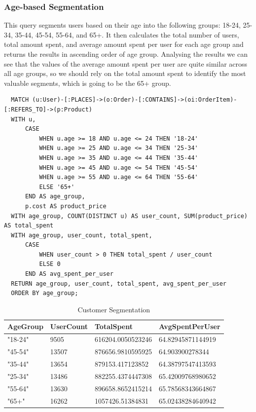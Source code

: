 \documentclass[a4paper,12pt]{article}
\begin{document}
\subsubsection{Age-based Segmentation}
This query segments users based on their age into the following groups: 18-24, 25-34, 35-44, 45-54, 55-64, and 65+.
It then calculates the total number of users, total amount spent, and average amount spent per user for each age group and returns the results in ascending order of age group.
Analysing the results we can see that the values of the average amount spent per user are quite similar across all age groups, so we should rely on the total amount spent to identify the most valuable segments, which is going to be the 65+ group.
\begin{verbatim}
  MATCH (u:User)-[:PLACES]->(o:Order)-[:CONTAINS]->(oi:OrderItem)-[:REFERS_TO]->(p:Product)
  WITH u, 
      CASE 
          WHEN u.age >= 18 AND u.age <= 24 THEN '18-24'
          WHEN u.age >= 25 AND u.age <= 34 THEN '25-34'
          WHEN u.age >= 35 AND u.age <= 44 THEN '35-44'
          WHEN u.age >= 45 AND u.age <= 54 THEN '45-54'
          WHEN u.age >= 55 AND u.age <= 64 THEN '55-64'
          ELSE '65+'
      END AS age_group, 
      p.cost AS product_price
  WITH age_group, COUNT(DISTINCT u) AS user_count, SUM(product_price) AS total_spent
  WITH age_group, user_count, total_spent, 
      CASE 
          WHEN user_count > 0 THEN total_spent / user_count
          ELSE 0
      END AS avg_spent_per_user
  RETURN age_group, user_count, total_spent, avg_spent_per_user
  ORDER BY age_group;
\end{verbatim}

\begin{table}[h!]
  \centering
  \caption{Customer Segmentation}
  \label{tab:processing_data}
  \begin{tabular}{l l l l}
      \toprule
      \textbf{AgeGroup} & \textbf{UserCount} & \textbf{TotalSpent} & \textbf{AvgSpentPerUser}\\
      \midrule
      "18-24" & 9505 & 616204.0050523246 & 64.82945871144919 \\
      "45-54" & 13507 & 876656.9810595925 & 64.903900278344 \\
      "35-44" & 13654 & 879153.417123852 & 64.38797547413593 \\
      "25-34" & 13486 & 882255.4374447308 & 65.42009768980652 \\
      "55-64" & 13630 & 896658.8652415214 & 65.78568343664867 \\
      "65+" & 16262 & 1057426.51384831 & 65.02438284640942 \\
      \bottomrule
  \end{tabular}
\end{table}
\end{document}

